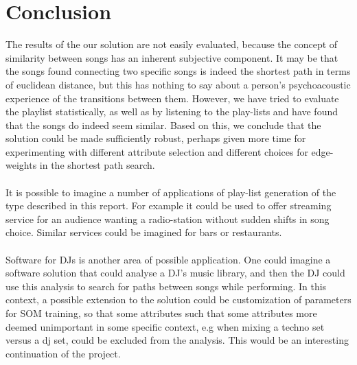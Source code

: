 \section{Conclusion} %
\label{sec:applications}
The results of the our solution are not easily evaluated, because the concept of similarity between songs has an inherent subjective component. It may be that the songs found connecting two specific songs is indeed the shortest path in terms of euclidean distance, but this has nothing to say about a person's psychoacoustic experience of the transitions between them. However, we have tried to evaluate the playlist statistically, as well as by listening to the play-lists and have found that the songs do indeed seem similar. Based on this, we conclude that the solution could be made sufficiently robust, perhaps given more time for experimenting with different attribute selection and different choices for edge-weights in the shortest path search.
\\\\
It is possible to imagine a number of applications of play-list generation of the type described in this report. For example it could be used to offer streaming service for an audience wanting a radio-station without sudden shifts in song choice. Similar services could be imagined for bars or restaurants.
\\\\
Software for DJs is another area of possible application. One could imagine a software solution that could analyse a DJ's music library, and then the DJ could use this analysis to search for paths between songs while performing. In this context, a possible extension to the solution could be customization of parameters for SOM training, so that some attributes such that some attributes more deemed unimportant in some specific context, e.g when mixing a techno set versus a dj set, could be excluded from the analysis. This would be an interesting continuation of the project.

